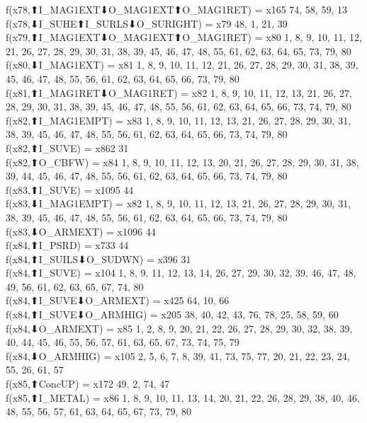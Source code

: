 f(x78,⬆I_MAG1EXT⬇O_MAG1EXT⬆O_MAG1RET) = x165 {74, 58, 59, 13} \\
f(x78,⬇I_SUHE⬆I_SURLS⬇O_SURIGHT) = x79 {48, 1, 21, 39} \\
f(x79,⬆I_MAG1EXT⬇O_MAG1EXT⬆O_MAG1RET) = x80 {1, 8, 9, 10, 11, 12, 21, 26, 27, 28, 29, 30, 31, 38, 39, 45, 46, 47, 48, 55, 61, 62, 63, 64, 65, 73, 79, 80} \\
f(x80,⬇I_MAG1EXT) = x81 {1, 8, 9, 10, 11, 12, 21, 26, 27, 28, 29, 30, 31, 38, 39, 45, 46, 47, 48, 55, 56, 61, 62, 63, 64, 65, 66, 73, 79, 80} \\
f(x81,⬆I_MAG1RET⬇O_MAG1RET) = x82 {1, 8, 9, 10, 11, 12, 13, 21, 26, 27, 28, 29, 30, 31, 38, 39, 45, 46, 47, 48, 55, 56, 61, 62, 63, 64, 65, 66, 73, 74, 79, 80} \\
f(x82,⬆I_MAG1EMPT) = x83 {1, 8, 9, 10, 11, 12, 13, 21, 26, 27, 28, 29, 30, 31, 38, 39, 45, 46, 47, 48, 55, 56, 61, 62, 63, 64, 65, 66, 73, 74, 79, 80} \\
f(x82,⬆I_SUVE) = x862 {31} \\
f(x82,⬆O_CBFW) = x84 {1, 8, 9, 10, 11, 12, 13, 20, 21, 26, 27, 28, 29, 30, 31, 38, 39, 44, 45, 46, 47, 48, 55, 56, 61, 62, 63, 64, 65, 66, 73, 74, 79, 80} \\
f(x83,⬆I_SUVE) = x1095 {44} \\
f(x83,⬇I_MAG1EMPT) = x82 {1, 8, 9, 10, 11, 12, 13, 21, 26, 27, 28, 29, 30, 31, 38, 39, 45, 46, 47, 48, 55, 56, 61, 62, 63, 64, 65, 66, 73, 74, 79, 80} \\
f(x83,⬇O_ARMEXT) = x1096 {44} \\
f(x84,⬆I_PSRD) = x733 {44} \\
f(x84,⬆I_SUILS⬇O_SUDWN) = x396 {31} \\
f(x84,⬆I_SUVE) = x104 {1, 8, 9, 11, 12, 13, 14, 26, 27, 29, 30, 32, 39, 46, 47, 48, 49, 56, 61, 62, 63, 65, 67, 74, 80} \\
f(x84,⬆I_SUVE⬇O_ARMEXT) = x425 {64, 10, 66} \\
f(x84,⬆I_SUVE⬇O_ARMHIG) = x205 {38, 40, 42, 43, 76, 78, 25, 58, 59, 60} \\
f(x84,⬇O_ARMEXT) = x85 {1, 2, 8, 9, 20, 21, 22, 26, 27, 28, 29, 30, 32, 38, 39, 40, 44, 45, 46, 55, 56, 57, 61, 63, 65, 67, 73, 74, 75, 79} \\
f(x84,⬇O_ARMHIG) = x105 {2, 5, 6, 7, 8, 39, 41, 73, 75, 77, 20, 21, 22, 23, 24, 55, 26, 61, 57} \\
f(x85,⬆ConcUP) = x172 {49, 2, 74, 47} \\
f(x85,⬆I_METAL) = x86 {1, 8, 9, 10, 11, 13, 14, 20, 21, 22, 26, 28, 29, 38, 40, 46, 48, 55, 56, 57, 61, 63, 64, 65, 67, 73, 79, 80} \\
